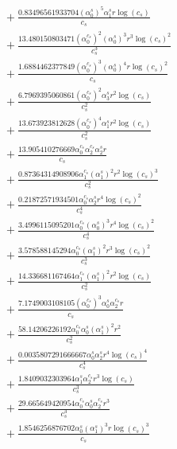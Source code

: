 \documentclass[10pt]{article}
\begin{document}
\begin{align*}
&{}  + \frac{0.83496561933704 \left(\alpha_{0}^s\right)^{5} \alpha_{1}^s r \log{\left(c_{s} \right)}}{c_{s}} \\
&{}  + \frac{13.480150803471 \left(\alpha_{0}^{c_s}\right)^{2} \left(\alpha_{0}^s\right)^{3} r^{3} \log{\left(c_{s} \right)}^{2}}{c_{s}^{3}} \\
&{}  + \frac{1.6884462377849 \left(\alpha_{0}^{c_s}\right)^{3} \left(\alpha_{0}^s\right)^{4} r \log{\left(c_{s} \right)}^{2}}{c_{s}} \\
&{}  + \frac{6.7969395060861 \left(\alpha_{0}^{c_s}\right)^{2} \alpha_{3}^s r^{2} \log{\left(c_{s} \right)}}{c_{s}^{2}} \\
&{}  + \frac{13.673923812628 \left(\alpha_{0}^{c_s}\right)^{4} \alpha_{1}^s r^{2} \log{\left(c_{s} \right)}}{c_{s}^{2}} \\
&{}  + \frac{13.905410276669 \alpha_{0}^{c_s} \alpha_{2}^{c_s} \alpha_{2}^s r}{c_{s}} \\
&{}  + \frac{0.87364314908906 \alpha_{1}^{c_s} \left(\alpha_{1}^s\right)^{2} r^{2} \log{\left(c_{s} \right)}^{3}}{c_{s}^{2}} \\
&{}  + \frac{0.21872571934501 \alpha_{0}^{c_s} \alpha_{2}^s r^{4} \log{\left(c_{s} \right)}^{2}}{c_{s}^{4}} \\
&{}  + \frac{3.4996115095201 \alpha_{0}^{c_s} \left(\alpha_{0}^s\right)^{3} r^{4} \log{\left(c_{s} \right)}^{2}}{c_{s}^{4}} \\
&{}  + \frac{3.578588145294 \alpha_{0}^{c_s} \left(\alpha_{1}^s\right)^{2} r^{3} \log{\left(c_{s} \right)}^{2}}{c_{s}^{3}} \\
&{}  + \frac{14.336681167464 \alpha_{1}^{c_s} \left(\alpha_{1}^s\right)^{2} r^{2} \log{\left(c_{s} \right)}}{c_{s}^{2}} \\
&{}  + \frac{7.1749003108105 \left(\alpha_{0}^{c_s}\right)^{3} \alpha_{0}^s \alpha_{2}^{c_s} r}{c_{s}} \\
&{}  + \frac{58.14206226192 \alpha_{0}^{c_s} \alpha_{0}^s \left(\alpha_{1}^s\right)^{2} r^{2}}{c_{s}^{2}} \\
&{}  + \frac{0.0035807291666667 \alpha_{0}^s \alpha_{2}^s r^{4} \log{\left(c_{s} \right)}^{4}}{c_{s}^{4}} \\
&{}  + \frac{1.8409032303964 \alpha_{1}^s \alpha_{2}^{c_s} r^{3} \log{\left(c_{s} \right)}}{c_{s}^{3}} \\
&{}  + \frac{29.665649420954 \alpha_{0}^{c_s} \alpha_{0}^s \alpha_{2}^{c_s} r^{3}}{c_{s}^{3}} \\
&{}  + \frac{1.8546256876702 \alpha_{0}^s \left(\alpha_{1}^s\right)^{3} r \log{\left(c_{s} \right)}^{3}}{c_{s}} \\

\end{align*}
\end{document}
